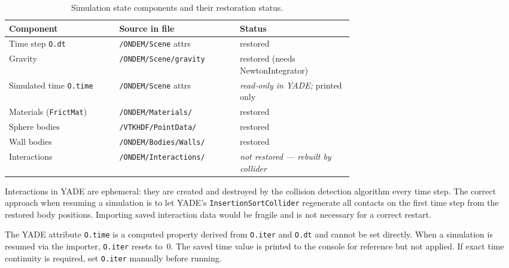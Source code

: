 \documentclass[11pt,a4paper]{article}
\begin{document}
\begin{table}[htbp]
\centering
\begin{tabularx}{\textwidth}{>{\raggedright\arraybackslash}p{0.32\linewidth}>{\ttfamily\small\raggedright\arraybackslash}p{0.35\linewidth}>{\small\raggedright\arraybackslash}X}
\toprule
\sffamily\textbf{Component} & \sffamily\textbf{Source in file} & \sffamily\textbf{Status} \\
\midrule
Time step \texttt{O.dt}   & \texttt{/ONDEM/Scene} attrs     & restored \\
Gravity                    & \texttt{/ONDEM/Scene/gravity}   & restored (needs NewtonIntegrator) \\
Simulated time \texttt{O.time} & \texttt{/ONDEM/Scene} attrs & \emph{read-only in YADE;} printed only \\
Materials (\texttt{FrictMat}) & \texttt{/ONDEM/Materials/}   & restored \\
Sphere bodies              & \texttt{/VTKHDF/PointData/}     & restored \\
Wall bodies                & \texttt{/ONDEM/Bodies/Walls/}   & restored \\
Interactions               & \texttt{/ONDEM/Interactions/}   & \emph{not restored — rebuilt by collider} \\
\bottomrule
\end{tabularx}
\caption{Simulation state components and their restoration status.}
\end{table}

\begin{notebox}
Interactions in YADE are ephemeral: they are created and destroyed by the
collision detection algorithm every time step. The correct approach when
resuming a simulation is to let YADE's \texttt{InsertionSortCollider}
regenerate all contacts on the first time step from the restored body
positions. Importing saved interaction data would be fragile and is not
necessary for a correct restart.
\end{notebox}

\begin{warnbox}
The YADE attribute \texttt{O.time} is a computed property derived from
\texttt{O.iter} and \texttt{O.dt} and cannot be set directly. When a
simulation is resumed via the importer, \texttt{O.iter} resets to~0.
The saved time value is printed to the console for reference but not
applied. If exact time continuity is required, set \texttt{O.iter}
manually before running.
\end{warnbox}
\end{document}
